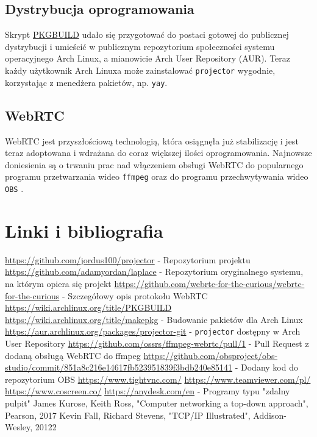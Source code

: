 \documentclass[a4paper,11pt]{article}
\begin{document}
    \subsection{Dystrybucja oprogramowania}
        Skrypt \hyperref[PKGBUILD]{PKGBUILD} udało się przygotować do postaci gotowej do publicznej dystrybucji i umieścić w publicznym repozytorium społeczności systemu operacyjnego Arch Linux, a mianowicie Arch User Repository (AUR).
        Teraz każdy użytkownik Arch Linuxa może zainstalować \texttt{projector} \cite{5} wygodnie, korzystając z menedżera pakietów, np. \texttt{yay}.
    \subsection{WebRTC}
        WebRTC jest przyszłościową technologią, która osiągnęła już stabilizację i jest teraz adoptowana i wdrażana do coraz większej ilości oprogramowania. 
        Najnowsze doniesienia są o trwaniu prac nad włączeniem obsługi WebRTC do popularnego programu przetwarzania wideo \texttt{ffmpeg} \cite{6} oraz do programu przechwytywania wideo \texttt{OBS} \cite{7}.
    \section{Linki i bibliografia}
        \renewcommand\refname{}
        \begin{thebibliography}{99}
         \url{https://github.com/jordus100/projector} - Repozytorium projektu
         \url{https://github.com/adamyordan/laplace} - Repozytorium oryginalnego systemu, na którym opiera się projekt
         \url{https://github.com/webrtc-for-the-curious/webrtc-for-the-curious} - Szczegółowy opis protokołu WebRTC
         \url{https://wiki.archlinux.org/title/PKGBUILD} \\ \url{https://wiki.archlinux.org/title/makepkg} - Budowanie pakietów dla Arch Linux
         \url{https://aur.archlinux.org/packages/projector-git} - \texttt{projector} dostępny w Arch User Repository
         \url{https://github.com/ossrs/ffmpeg-webrtc/pull/1} - Pull Request z dodaną obsługą WebRTC do ffmpeg
         \url{https://github.com/obsproject/obs-studio/commit/851a8c216e14617fb523951839f3bdb240e85141} - Dodany kod do repozytorium OBS
         \url{https://www.tightvnc.com/} \url{https://www.teamviewer.com/pl/} \url{https://www.coscreen.co/} \url{https://anydesk.com/en} - Programy typu "zdalny pulpit"
         James Kurose, Keith Ross, "Computer networking a top-down approach", Pearson, 2017
         Kevin Fall, Richard Stevens, "TCP/IP Illustrated", Addison-Wesley, 20122
        \end{thebibliography}
\end{document}
